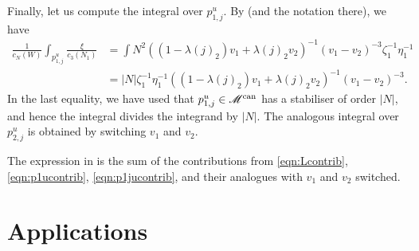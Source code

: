 \documentclass{amsart}
\begin{document}
Finally, let us compute the integral over \(p_{1,j}^u\).
By  (and the notation there), we have
\begin{equation}\label{eqn:p1jucontrib}
  \begin{split}
    \frac{1}{c_N(W)}\int_{p_{1,j}^u} \frac{\xi}{c_3(N_1)} &=
                                                                                        \int {N^2}{((1-\lambda(j)_2) v_1 + \lambda(j)_2 v_2)^{-1}(v_1-v_2)^{-3}\zeta^{-1}_1\eta^{-1}_1} \\
                                                                                      &= {|N|}{\zeta^{-1}_1\eta^{-1}_1((1-\lambda(j)_2) v_1 + \lambda(j)_2 v_2)^{-1}(v_1-v_2)^{-3}}.
  \end{split}
\end{equation}
In the last equality, we have used that \(p_{1,j}^u \in \mathscr M^{\rm can}\) has a stabiliser of order \(|N|\), and hence the integral divides the integrand by \(|N|\).
The analogous integral over \(p_{2,j}^u\) is obtained by switching \(v_1\) and \(v_2\).

The expression in  is the sum of the contributions from \eqref{eqn:Lcontrib}, \eqref{eqn:p1ucontrib}, \eqref{eqn:p1jucontrib}, and their analogues with \(v_1\) and \(v_2\) switched.

\section{Applications}\label{sec:applications}
\end{document}
